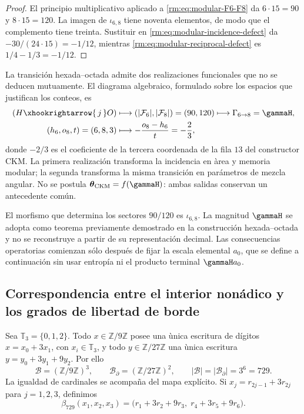 \begin{proof}
El principio multiplicativo aplicado a
\cref{rm:eq:modular-F6-F8} da \(6\cdot15=90\) y \(8\cdot15=120\).
La imagen de \(\iota_{6,8}\) tiene noventa elementos, de modo que el
complemento tiene treinta. Sustituir en
\cref{rm:eq:modular-incidence-defect} da
\(-30/(24\cdot15)=-1/12\), mientras
\cref{rm:eq:modular-reciprocal-defect} es
\(1/4-1/3=-1/12\).
\end{proof}

La transici\'on hexada--octada admite dos realizaciones funcionales que no
se deducen mutuamente. El diagrama algebraico, formulado sobre los espacios
que justifican los conteos, es
\begin{equation}
\label{rm:eq:modular-68-two-readers}
\begin{aligned}
(H\xhookrightarrow{\,j\,}O)
&\longmapsto
\left(|\mathcal F_6|,|\mathcal F_8|\right)=(90,120)
\longmapsto\Gamma_{6\to8}=\gammaH,\\
(h_6,o_8,t)=(6,8,3)
&\longmapsto-\frac{o_8-h_6}{t}=-\frac23,
\end{aligned}
\end{equation}
donde \(-2/3\) es el coeficiente de la tercera coordenada de la fila
\(13\) del constructor CKM. La primera realizaci\'on transforma la
incidencia en \`area y memoria modular; la segunda transforma la misma
transici\'on en par\'ametros de mezcla angular.
No se postula \(\boldsymbol\theta_{\rm CKM}=f(\gammaH)\): ambas salidas
conservan un antecedente com\'un.

El morfismo que determina los sectores \(90/120\) es
\(\iota_{6,8}\). La magnitud \(\gammaH\) se adopta como teorema previamente
demostrado en la construcci\'on hexada--octada y no se reconstruye a partir
de su representaci\'on decimal. Las
consecuencias operatorias comienzan s\'olo despu\'es de fijar la escala
elemental \(a_0\), que se define a continuaci\'on sin usar entrop\'ia ni el
producto terminal \(\gammaH a_0\).

\subsection{Correspondencia entre el interior non\'adico y los grados de libertad de borde}

Sea \(\mathbb T_3=\{0,1,2\}\). Todo \(x\in\mathbb Z/9\mathbb Z\) posee
una \`unica escritura de d\'igitos
\(x=x_0+3x_1\), con \(x_i\in\mathbb T_3\), y todo
\(y\in\mathbb Z/27\mathbb Z\) una \`unica escritura
\(y=y_0+3y_1+9y_2\). Por ello
\begin{equation}
\label{rm:eq:modular-bulk-boundary-729}
\mathcal B=(\mathbb Z/9\mathbb Z)^3,
\qquad
\mathcal B_\partial=(\mathbb Z/27\mathbb Z)^2,
\qquad
|\mathcal B|=|\mathcal B_\partial|=3^6=729.
\end{equation}
La igualdad de cardinales se acompa\~na del mapa expl\'icito. Si
\(x_j=r_{2j-1}+3r_{2j}\) para \(j=1,2,3\), definimos
\begin{equation}
\label{rm:eq:modular-beta729}
\beta_{729}(x_1,x_2,x_3)
=\bigl(r_1+3r_2+9r_3,\;r_4+3r_5+9r_6\bigr).
\end{equation}

